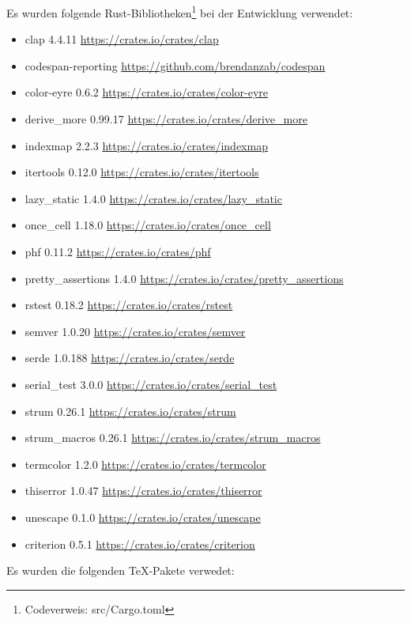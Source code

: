     \noindent Es wurden folgende Rust-Bibliotheken\footnote{Codeverweis: src/Cargo.toml} bei der Entwicklung verwendet:

    \begin{itemize}
        \item clap 4.4.11 \url{https://crates.io/crates/clap}
        \item codespan-reporting \url{https://github.com/brendanzab/codespan}
        \item color-eyre 0.6.2 \url{https://crates.io/crates/color-eyre}
        \item derive_more 0.99.17 \url{https://crates.io/crates/derive_more}
        \item indexmap 2.2.3 \url{https://crates.io/crates/indexmap}
        \item itertools 0.12.0 \url{https://crates.io/crates/itertools}
        \item lazy\_static 1.4.0 \url{https://crates.io/crates/lazy_static}
        \item once\_cell 1.18.0 \url{https://crates.io/crates/once_cell}
        \item phf 0.11.2 \url{https://crates.io/crates/phf}
        \item pretty_assertions 1.4.0 \url{https://crates.io/crates/pretty_assertions}
        \item rstest 0.18.2 \url{https://crates.io/crates/rstest}
        \item semver 1.0.20 \url{https://crates.io/crates/semver}
        \item serde 1.0.188 \url{https://crates.io/crates/serde}
        \item serial_test 3.0.0 \url{https://crates.io/crates/serial_test}
        \item strum 0.26.1 \url{https://crates.io/crates/strum}
        \item strum\_macros 0.26.1 \url{https://crates.io/crates/strum_macros}
        \item termcolor 1.2.0 \url{https://crates.io/crates/termcolor}
        \item thiserror 1.0.47 \url{https://crates.io/crates/thiserror}
        \item unescape 0.1.0 \url{https://crates.io/crates/unescape}
        \item criterion 0.5.1 \url{https://crates.io/crates/criterion}
    \end{itemize}

    \noindent Es wurden die folgenden TeX-Pakete verwedet:


